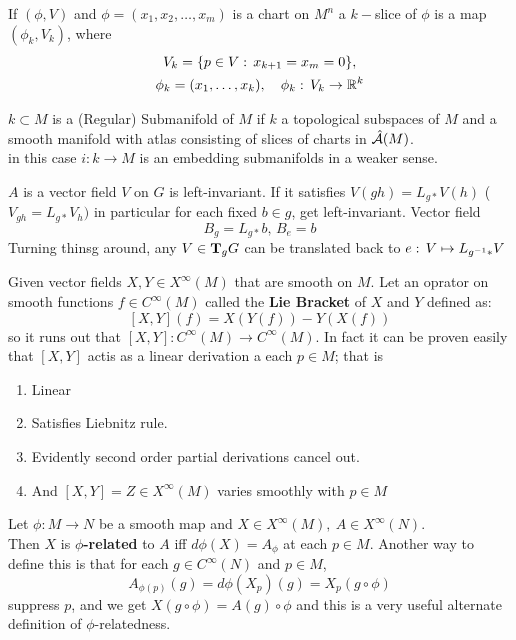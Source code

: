 \documentclass{beamer}
\begin{document}
\begin{frame}
\begin{ddef}
If $(\phi,V)$ and $\phi=(x_1,x_2,\ldots, x_m)$ is a chart on $M^n$ a $k-$slice of $\phi$ is a map $(\phi_k,V_k)$, where
\begin{gather*}
V_k = \{p\in V:\, x_{k+1} = x_m =0\},\\
\phi_k=(x_1,\ldots, x_k),\quad \phi_k:\, V_k \to \mathbb{R}^k
\end{gather*}
\end{ddef}
\begin{ddef}
$k\subset M$ is a (Regular) Submanifold of $M$ if $k$ a topological subspaces of $M$ and a smooth manifold with atlas consisting of slices of charts in $\hat {\mathcal{A}}(M)$.\\
in this case $i: k\to M$ is an embedding submanifolds in a weaker sense.
\end{ddef}
\end{frame}
\begin{frame}
\end{frame}
\begin{frame}
\begin{ddef}
$A$ is a vector field $V$ on $G$ is left-invariant. If it satisfies $V(gh)=L_{g*}V(h)$ ($V_{gh} = L_{g*}V_h)$ in particular for each fixed $b\in g$, get left-invariant. Vector field
$$B_g = L_{g*}b ,\, B_e=b$$
Turning thinsg around, any $V\in \text{\textbf{T}}_gG$ can be translated back to $e:\, V \mapsto L_{g^{-1}*} V$ 
\end{ddef}
\end{frame}
\begin{frame}
\begin{ddef}
Given vector fields $X,Y\in X^\infty (M)$ that are smooth on $M$. Let an oprator on smooth functions $f\in C^\infty(M)$ called the \textbf{Lie Bracket} of $X$ and $Y$ defined as:
$$[X,Y](f) = X(Y(f)) - Y(X(f))$$
so it runs out that $[X,Y]: C^\infty(M) \to C^\infty(M)$. In fact it can be proven easily that $[X,Y]$ actis as a linear derivation a each $p\in M$; that is 
\begin{enumerate}[1)]
\item Linear 
\item Satisfies Liebnitz rule.
\item Evidently second order partial derivations cancel out.
\item And $[X,Y]=Z\in X^\infty(M)$ varies smoothly with $p\in M$ 
\end{enumerate}
\end{ddef}
\begin{ddef}
Let $\phi: M\to N$ be a smooth map  and $X\in X^\infty(M),\ A\in X^\infty(N)$.\\
Then $X$ is \textbf{$\phi$-related} to $A$ iff $d\phi(X) = A_\phi$ at each $p\in M$.  Another way to define this is that for each $g\in C^\infty(N)$ and $p\in M$,
$$A_{\phi(p)} (g) = d\phi (X_p) (g) = X_p(g\circ \phi) $$
suppress $p$, and we get $X(g\circ \phi) = A(g)\circ \phi$ and this is a very useful alternate definition of $\phi$-relatedness.
\end{ddef}
\end{frame}
\end{document}

